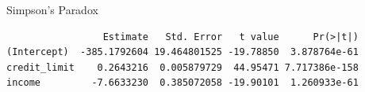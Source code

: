 \documentclass[
  ignorenonframetext,
]{beamer}
\newenvironment{Shaded}{\begin{snugshade}}{\end{snugshade}}
\newcommand{\AttributeTok}[1]{\textcolor[rgb]{0.13,0.29,0.53}{#1}}
\newcommand{\FunctionTok}[1]{\textcolor[rgb]{0.13,0.29,0.53}{\textbf{#1}}}
\newcommand{\NormalTok}[1]{#1}
\newcommand{\OtherTok}[1]{\textcolor[rgb]{0.56,0.35,0.01}{#1}}
\newcommand{\SpecialCharTok}[1]{\textcolor[rgb]{0.81,0.36,0.00}{\textbf{#1}}}
\begin{document}
\begin{frame}[fragile]{Simpson's Paradox}
\label{simpsons-paradox-1}
\small

\begin{Shaded}
\end{Shaded}

\begin{verbatim}
                 Estimate   Std. Error   t value      Pr(>|t|)
(Intercept)  -385.1792604 19.464801525 -19.78850  3.878764e-61
credit_limit    0.2643216  0.005879729  44.95471 7.717386e-158
income         -7.6633230  0.385072058 -19.90101  1.260933e-61
\end{verbatim}

\normalsize
\end{frame}
\end{document}
